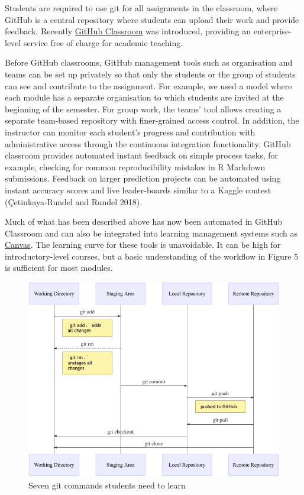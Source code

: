\documentclass{article}
\begin{document}
Students are required to use git for all assignments in the classroom,
where GitHub is a central repository where students can upload their
work and provide feedback. Recently
\href{https://classroom.github.com/}{GitHub Classroom} was introduced,
providing an enterprise-level service free of charge for academic
teaching.

Before GitHub classrooms, GitHub management tools such as organisation
and teams can be set up privately so that only the students or the group
of students can see and contribute to the assignment. For example, we
used a model where each module has a separate organisation to which
students are invited at the beginning of the semester. For group work,
the teams' tool allows creating a separate team-based repository with
finer-grained access control. In addition, the instructor can monitor
each student's progress and contribution with administrative access
through the continuous integration functionality. GitHub classroom
provides automated instant feedback on simple process tasks, for
example, checking for common reproducibility mistakes in R Markdown
submissions. Feedback on larger prediction projects can be automated
using instant accuracy scores and live leader-boards similar to a Kaggle
contest (Çetinkaya-Rundel and Rundel 2018).

Much of what has been described above has now been automated in GitHub
Classroom and can also be integrated into learning management systems
such as
\href{https://docs.github.com/en/education/manage-coursework-with-github-classroom/teach-with-github-classroom/connect-a-learning-management-system-to-github-classroom}{Canvas}.
The learning curve for these tools is unavoidable. It can be high for
introductory-level courses, but a basic understanding of the workflow in
Figure 5 is sufficient for most modules.

\begin{figure}

{\centering \includegraphics{qrap_paper_files/figure-latex/github-workflow-1} 

}

\caption{Seven git commands students need to learn}\label{fig:github-workflow}
\end{figure}
\end{document}
